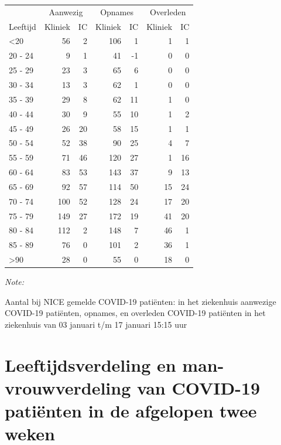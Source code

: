 \documentclass[
  english,
  man,floatsintext]{apa6}
\begin{document}
\begin{table}
\centering\begingroup\fontsize{10}{12}\selectfont

\begin{threeparttable}
\begin{tabular}{lrrrrrr}
\toprule
\multicolumn{1}{c}{ } & \multicolumn{2}{c}{Aanwezig} & \multicolumn{2}{c}{Opnames} & \multicolumn{2}{c}{Overleden} \\
\cmidrule(l{3pt}r{3pt}){2-3} \cmidrule(l{3pt}r{3pt}){4-5} \cmidrule(l{3pt}r{3pt}){6-7}
Leeftijd & Kliniek & IC & Kliniek & IC & Kliniek & IC\\
\midrule
<20 & 56 & 2 & 106 & 1 & 1 & 1\\
20 - 24 & 9 & 1 & 41 & -1 & 0 & 0\\
25 - 29 & 23 & 3 & 65 & 6 & 0 & 0\\
30 - 34 & 13 & 3 & 62 & 1 & 0 & 0\\
35 - 39 & 29 & 8 & 62 & 11 & 1 & 0\\
40 - 44 & 30 & 9 & 55 & 10 & 1 & 2\\
45 - 49 & 26 & 20 & 58 & 15 & 1 & 1\\
50 - 54 & 52 & 38 & 90 & 25 & 4 & 7\\
55 - 59 & 71 & 46 & 120 & 27 & 1 & 16\\
60 - 64 & 83 & 53 & 143 & 37 & 9 & 13\\
65 - 69 & 92 & 57 & 114 & 50 & 15 & 24\\
70 - 74 & 100 & 52 & 128 & 24 & 17 & 20\\
75 - 79 & 149 & 27 & 172 & 19 & 41 & 20\\
80 - 84 & 112 & 2 & 148 & 7 & 46 & 1\\
85 - 89 & 76 & 0 & 101 & 2 & 36 & 1\\
>90 & 28 & 0 & 55 & 0 & 18 & 0\\
\bottomrule
\end{tabular}
\begin{tablenotes}
\item \textit{Note: } 
\item Aantal bij NICE gemelde COVID-19 patiënten: in het ziekenhuis aanwezige COVID-19 patiënten, opnames, en overleden COVID-19 patiënten in het ziekenhuis van 03 januari t/m 17 januari 15:15 uur
\end{tablenotes}
\end{threeparttable}
\endgroup{}
\end{table}

\newpage

\hypertarget{leeftijdsverdeling-en-man-vrouwverdeling-van-covid-19-patiuxebnten-in-de-afgelopen-twee-weken}{%
\section{Leeftijdsverdeling en man-vrouwverdeling van COVID-19 patiënten in de afgelopen twee weken}\label{leeftijdsverdeling-en-man-vrouwverdeling-van-covid-19-patiuxebnten-in-de-afgelopen-twee-weken}}
\end{document}
